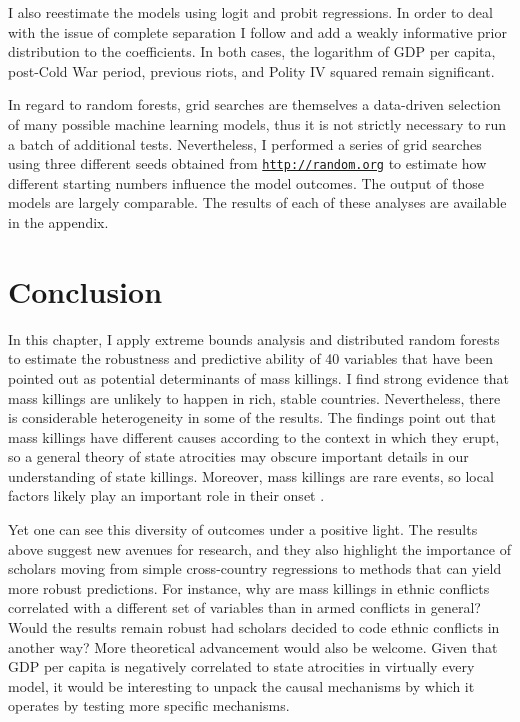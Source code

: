 \documentclass[a4paper,12pt]{article}
\begin{document}
I also reestimate the models using logit and probit regressions. In order to deal with the issue of complete separation \citep{bell2015questioning,zorn2005solution} I follow \citet{gelman2008weakly} and add a weakly informative prior distribution to the coefficients. In both cases, the logarithm of GDP per capita, post-Cold War period, previous riots, and Polity IV squared remain significant. 
	
In regard to random forests, grid searches are themselves a data-driven selection of many possible machine learning models, thus it is not strictly necessary to run a batch of additional tests. Nevertheless, I performed a series of grid searches using three different seeds obtained from \href{https://random.org}{\texttt{http://random.org}} to estimate how different starting numbers influence the model outcomes. The output of those models are largely comparable. The results of each of these analyses are available in the appendix.

\section{Conclusion}
\label{sec:conclusion}
	
In this chapter, I apply extreme bounds analysis and distributed random forests to estimate the robustness and predictive ability of 40 variables that have been pointed out as potential determinants of mass killings. I find strong evidence that mass killings are unlikely to happen in rich, stable countries. Nevertheless, there is considerable heterogeneity in some of the results. The findings point out that mass killings have different causes according to the context in which they erupt, so a general theory of state atrocities may obscure important details in our understanding of state killings. Moreover, mass killings are rare events, so local factors likely play an important role in their onset \citep{straus2007second,straus2012destroy}.
	
Yet one can see this diversity of outcomes under a positive light. The results above suggest new avenues for research, and they also highlight the importance of scholars moving from simple cross-country regressions to methods that can yield more robust predictions. For instance, why are mass killings in ethnic conflicts correlated with a different set of variables than in armed conflicts in general? Would the results remain robust had scholars decided to code ethnic conflicts in another way? More theoretical advancement would also be welcome. Given that GDP per capita is negatively correlated to state atrocities in virtually every model, it would be interesting to unpack the causal mechanisms by which it operates by testing more specific mechanisms. 
	
\end{document}

